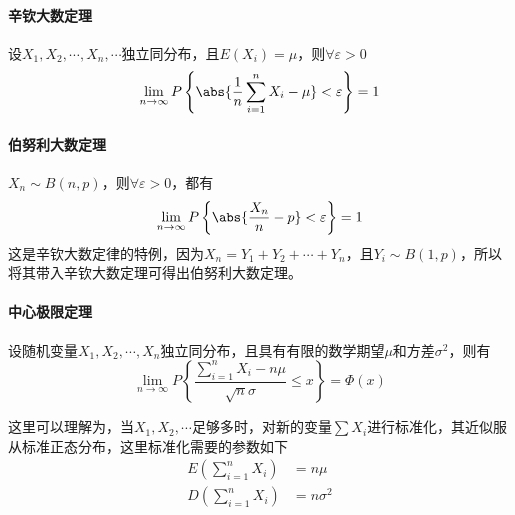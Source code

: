 \paragraph{辛钦大数定理}
设$X_1,X_2,\cdots,X_n,\cdots$独立同分布，且$E(X_i)=\mu$，则$\forall \varepsilon > 0$
\begin{eqnarray}
    \label{eq:辛钦定理}
    \lim_{n\to \infty} P\left\{ \abs{\frac{1}{n}\sum_{i=1}^n X_i - \mu} < \varepsilon \right\} = 1
\end{eqnarray}

\paragraph{伯努利大数定理}
$X_n \sim B(n,p)$，则$\forall \varepsilon > 0$，都有
\begin{equation}
    \label{eq:伯努利大数定理}
    \lim_{n\to \infty} P\left\{ \abs{\frac{X_n}{n} - p} < \varepsilon \right\} = 1
\end{equation}
这是辛钦大数定律的特例，因为$X_n = Y_1+Y_2+\cdots+Y_n$，且$Y_i\sim B(1,p)$，所以将其带入辛钦大数定理可得出伯努利大数定理。

\paragraph{中心极限定理}
设随机变量$X_1,X_2,\cdots,X_n$独立同分布，且具有有限的数学期望$\mu$和方差$\sigma^2$，则有
\begin{equation}
    \label{eq:中心极限定理}
    \lim_{n\to\infty} P\left\{ \frac{\sum_{i=1}^n X_i - n\mu}{\sqrt{n}\sigma} \leq x \right\} = \Phi(x)
\end{equation}

这里可以理解为，当$X_1,X_2,\cdots$足够多时，对新的变量$\sum X_i$进行标准化，其近似服从标准正态分布，这里标准化需要的参数如下
\begin{align*}
    E\left(\sum_{i=1}^n X_i\right) & = n\mu      \\
    D\left(\sum_{i=1}^n X_i\right) & = n\sigma^2
\end{align*}

